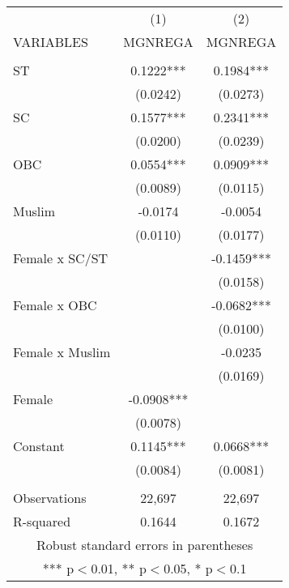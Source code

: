 \documentclass[]{article}
\begin{document}
\begin{tabular}{lcc} \hline
 & (1) & (2) \\
VARIABLES & MGNREGA & MGNREGA \\ \hline
 &  &  \\
ST & 0.1222*** & 0.1984*** \\
 & (0.0242) & (0.0273) \\
SC & 0.1577*** & 0.2341*** \\
 & (0.0200) & (0.0239) \\
OBC & 0.0554*** & 0.0909*** \\
 & (0.0089) & (0.0115) \\
Muslim & -0.0174 & -0.0054 \\
 & (0.0110) & (0.0177) \\
Female x SC/ST &  & -0.1459*** \\
 &  & (0.0158) \\
Female x OBC &  & -0.0682*** \\
 &  & (0.0100) \\
Female x Muslim &  & -0.0235 \\
 &  & (0.0169) \\
Female & -0.0908*** &  \\
 & (0.0078) &  \\
Constant & 0.1145*** & 0.0668*** \\
 & (0.0084) & (0.0081) \\
 &  &  \\
Observations & 22,697 & 22,697 \\
 R-squared & 0.1644 & 0.1672 \\ \hline
\multicolumn{3}{c}{ Robust standard errors in parentheses} \\
\multicolumn{3}{c}{ *** p$<$0.01, ** p$<$0.05, * p$<$0.1} \\
\end{tabular}
\end{document}
